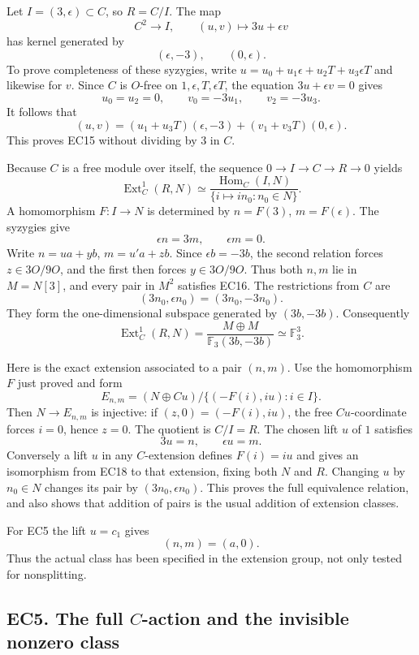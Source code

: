 \documentclass[
  10pt,
]{article}
\begin{document}
Let \(I=(3,\epsilon)\subset C\), so \(R=C/I\). The map \[
C^2\longrightarrow I,\qquad (u,v)\longmapsto3u+\epsilon v
\] has kernel generated by \[
(\epsilon,-3),\qquad(0,\epsilon).
\tag{EC15}
\] To prove completeness of these syzygies, write
\(u=u_0+u_1\epsilon+u_2T+u_3\epsilon T\) and likewise for \(v\). Since
\(C\) is \(O\)-free on \(1,\epsilon,T,\epsilon T\), the equation
\(3u+\epsilon v=0\) gives \[
u_0=u_2=0,\qquad v_0=-3u_1,\qquad v_2=-3u_3.
\] It follows that \[
(u,v)=(u_1+u_3T)(\epsilon,-3)+(v_1+v_3T)(0,\epsilon).
\] This proves EC15 without dividing by 3 in \(C\).

Because \(C\) is a free module over itself, the sequence
\(0\to I\to C\to R\to0\) yields \[
\operatorname{Ext}^1_C(R,N)
\simeq
\frac{\operatorname{Hom}_C(I,N)}
{\{i\mapsto in_0:n_0\in N\}}.
\] A homomorphism \(F:I\to N\) is determined by \(n=F(3)\),
\(m=F(\epsilon)\). The syzygies give \[
\epsilon n=3m,\qquad\epsilon m=0.
\tag{EC16}
\] Write \(n=u a+y b\), \(m=u'a+z b\). Since \(\epsilon b=-3b\), the
second relation forces \(z\in3O/9O\), and the first then forces
\(y\in3O/9O\). Thus both \(n,m\) lie in \(M=N[3]\), and every pair in
\(M^2\) satisfies EC16. The restrictions from \(C\) are \[
(3n_0,\epsilon n_0)=(3n_0,-3n_0).
\] They form the one-dimensional subspace generated by \((3b,-3b)\).
Consequently \[
\boxed{\operatorname{Ext}^1_C(R,N)
=\frac{M\oplus M}{\mathbb F_3(3b,-3b)}
\simeq\mathbb F_3^3.}
\tag{EC17}
\]

Here is the exact extension associated to a pair \((n,m)\). Use the
homomorphism \(F\) just proved and form \[
E_{n,m}=(N\oplus C u)/\{(-F(i),iu):i\in I\}.
\tag{EC18}
\] Then \(N\to E_{n,m}\) is injective: if \((z,0)=(-F(i),iu)\), the free
\(C u\)-coordinate forces \(i=0\), hence \(z=0\). The quotient is
\(C/I=R\). The chosen lift \(u\) of \(1\) satisfies \[
3u=n,\qquad\epsilon u=m.
\tag{EC19}
\] Conversely a lift \(u\) in any \(C\)-extension defines \(F(i)=iu\)
and gives an isomorphism from EC18 to that extension, fixing both \(N\)
and \(R\). Changing \(u\) by \(n_0\in N\) changes its pair by
\((3n_0,\epsilon n_0)\). This proves the full equivalence relation, and
also shows that addition of pairs is the usual addition of extension
classes.

For EC5 the lift \(u=c_1\) gives \[
(n,m)=(a,0).
\tag{EC20}
\] Thus the actual class has been specified in the extension group, not
only tested for nonsplitting.

\subsection{\texorpdfstring{EC5. The full \(C\)-action and the invisible
nonzero
class}{EC5. The full C-action and the invisible nonzero class}}\label{ec5.-the-full-c-action-and-the-invisible-nonzero-class}
\end{document}
